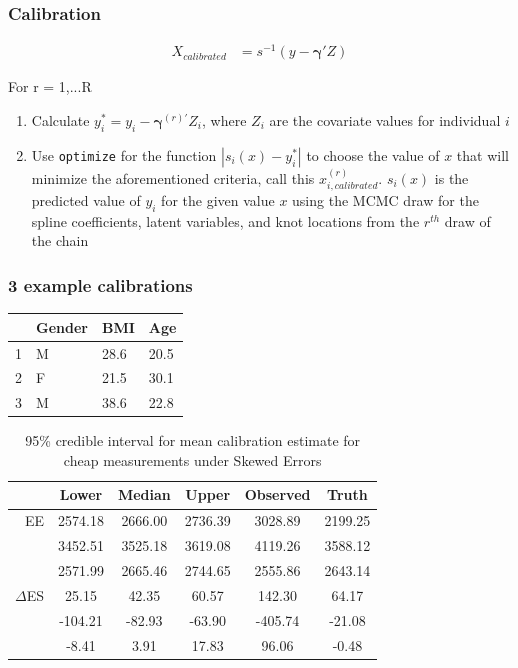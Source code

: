 \documentclass[handout]{beamer}\usepackage[]{graphicx}\usepackage[]{color}
\begin{document}
\begin{frame}
\frametitle{Calibration}

\begin{align*}
  X_{calibrated} &= s^{-1}(y-\boldsymbol{\gamma}' Z) 
\end{align*}

\vspace{0.3cm}

For r = 1,...R
\begin{enumerate}
\item
Calculate $y_i^* = y_i- \boldsymbol{\gamma}^{(r)'} Z_i$, where $Z_i$ are the covariate values for individual $i$
\item
Use \texttt{optimize} for the function $|s_i(x) - y_i^*|$ to choose the value of $x$ that will minimize the aforementioned criteria, call this $x_{i,calibrated}^{(r)}$. $s_i(x)$ is the predicted value of $y_i$ for the given value $x$ using the MCMC draw for the spline coefficients, latent variables, and knot locations from the $r^{th}$ draw of the chain

\end{enumerate}


\end{frame}

\begin{frame}
\frametitle{3 example calibrations}

\begin{table}
\begin{tabular}{l|lll}
\hline
 & Gender & BMI & Age \\
 \hline
 1 & M & 28.6 & 20.5 \\
 2 & F & 21.5 & 30.1 \\
 3 & M & 38.6 & 22.8 \\
 \hline
 \end{tabular}
 \end{table}

\begin{table}[ht]
\centering
\begin{tabular}{r|ccc|cc}
  \hline
& Lower & Median & Upper & Observed & Truth \\ 
  \hline
EE & 2574.18 & 2666.00 & 2736.39 & 3028.89 & 2199.25 \\ 
  & 3452.51 & 3525.18 & 3619.08 & 4119.26 & 3588.12 \\ 
  & 2571.99 & 2665.46 & 2744.65 & 2555.86 & 2643.14 \\ 
   \hline  
   $\Delta$ES & 25.15 & 42.35 & 60.57 & 142.30 & 64.17 \\ 
  & -104.21 & -82.93 & -63.90 & -405.74 & -21.08 \\ 
  & -8.41 & 3.91 & 17.83 & 96.06 & -0.48 \\ 
   \hline
\end{tabular}
\caption{95\% credible interval for mean calibration estimate for cheap measurements under Skewed Errors} 
\label{calibratedee}
\end{table}

\end{frame}
\end{document}

